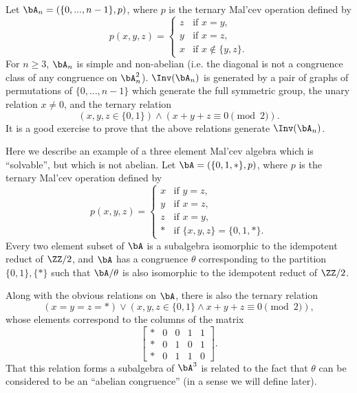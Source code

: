 \begin{ex}\label{ex-simple-nonab-malcev} Let $\bA_n = (\{0, ..., n-1\}, p)$, where $p$ is the ternary Mal'cev operation defined by
\[
p(x,y,z) = \begin{cases}z & \text{if }x=y,\\ y & \text{if }x=z,\\ x & \text{if } x\not\in\{y,z\}.\end{cases}
\]
For $n \ge 3$, $\bA_n$ is simple and non-abelian (i.e.\! the diagonal is not a congruence class of any congruence on $\bA_n^2$). $\Inv(\bA_n)$ is generated by a pair of graphs of permutations of $\{0,...,n-1\}$ which generate the full symmetric group, the unary relation $x \ne 0$, and the ternary relation
\[
(x,y,z \in \{0,1\}) \wedge (x+y+z \equiv 0\!\!\!\pmod{2}).
\]
It is a good exercise to prove that the above relations generate $\Inv(\bA_n)$.
\end{ex}

\begin{ex}\label{ex-solvable-nonab-malcev} Here we describe an example of a three element Mal'cev algebra which is ``solvable'', but which is not abelian. Let $\bA = (\{0,1,*\}, p)$, where $p$ is the ternary Mal'cev operation defined by
\[
p(x,y,z) = \begin{cases}x & \text{if }y=z,\\ y & \text{if }x=z,\\ z & \text{if } x=y,\\ * & \text{if } \{x,y,z\} = \{0,1,*\}.\end{cases}
\]
Every two element subset of $\bA$ is a subalgebra isomorphic to the idempotent reduct of $\ZZ/2$, and $\bA$ has a congruence $\theta$ corresponding to the partition $\{0,1\}, \{*\}$ such that $\bA/\theta$ is also isomorphic to the idempotent reduct of $\ZZ/2$.

Along with the obvious relations on $\bA$, there is also the ternary relation
\[
(x = y = z = *) \vee (x,y,z \in \{0,1\} \wedge x+y+z \equiv 0\!\!\!\pmod{2}),
\]
whose elements correspond to the columns of the matrix
\[
\begin{bmatrix} * & 0 & 0 & 1 & 1\\ * & 0 & 1 & 0 & 1\\ * & 0 & 1 & 1 & 0\end{bmatrix}.
\]
That this relation forms a subalgebra of $\bA^3$ is related to the fact that $\theta$ can be considered to be an ``abelian congruence'' (in a sense we will define later).
\end{ex}


